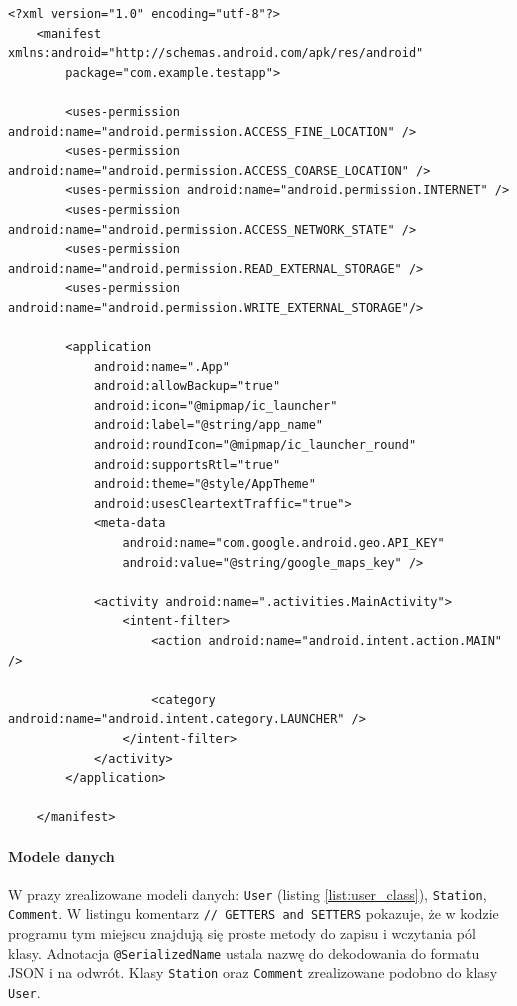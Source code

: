 \begin{lstlisting}[label=list:androidManifest,caption=androidManifest.xml.,basicstyle=\tiny\ttfamily]
    <?xml version="1.0" encoding="utf-8"?>
    <manifest xmlns:android="http://schemas.android.com/apk/res/android"
        package="com.example.testapp">
    
        <uses-permission android:name="android.permission.ACCESS_FINE_LOCATION" />
        <uses-permission android:name="android.permission.ACCESS_COARSE_LOCATION" />
        <uses-permission android:name="android.permission.INTERNET" />
        <uses-permission android:name="android.permission.ACCESS_NETWORK_STATE" />
        <uses-permission android:name="android.permission.READ_EXTERNAL_STORAGE" />
        <uses-permission android:name="android.permission.WRITE_EXTERNAL_STORAGE"/>
    
        <application
            android:name=".App"
            android:allowBackup="true"
            android:icon="@mipmap/ic_launcher"
            android:label="@string/app_name"
            android:roundIcon="@mipmap/ic_launcher_round"
            android:supportsRtl="true"
            android:theme="@style/AppTheme"
            android:usesCleartextTraffic="true">
            <meta-data
                android:name="com.google.android.geo.API_KEY"
                android:value="@string/google_maps_key" />
    
            <activity android:name=".activities.MainActivity">
                <intent-filter>
                    <action android:name="android.intent.action.MAIN" />
    
                    <category android:name="android.intent.category.LAUNCHER" />
                </intent-filter>
            </activity>
        </application>
    
    </manifest>
\end{lstlisting}

 
\paragraph{Modele danych\newline}
W prazy zrealizowane modeli danych: \texttt{User} (listing \ref{list:user_class}), \texttt{Station}, \texttt{Comment}. W listingu komentarz \texttt{// GETTERS and SETTERS} pokazuje, że w kodzie programu tym miejscu znajdują się proste metody do zapisu i wczytania pól klasy.
Adnotacja \texttt{@SerializedName} ustala nazwę do dekodowania do formatu JSON i na odwrót. Klasy \texttt{Station} oraz \texttt{Comment} zrealizowane podobno do klasy \texttt{User}.

